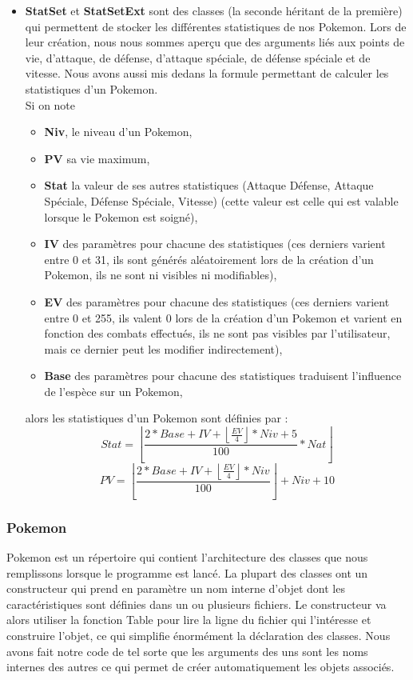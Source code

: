 \documentclass[a4paper,twoside, openany,11pt]{book}
\newcommand{\Floor}[1]{\left\lfloor #1 \right\rfloor}
\begin{document}
\begin{itemize}
\item  \textbf{StatSet} et \textbf{StatSetExt} sont des classes (la seconde héritant de la première) qui permettent de stocker les différentes statistiques de nos Pokemon. Lors de leur création, nous nous sommes aperçu que des arguments liés aux points de vie, d'attaque, de défense, d'attaque spéciale, de défense spéciale et de vitesse. Nous avons aussi mis dedans la formule permettant de calculer les statistiques d'un Pokemon. \\
Si on note
\begin{itemize}
\item \textbf{Niv}, le niveau d'un Pokemon, \\
\item \textbf{PV} sa vie maximum, \\
\item \textbf{Stat} la valeur de ses autres statistiques (Attaque Défense, Attaque Spéciale, Défense Spéciale, Vitesse) (cette valeur est celle qui est valable lorsque le Pokemon est soigné), \\
\item \textbf{IV} des paramètres pour chacune des statistiques (ces derniers varient entre 0 et 31, ils sont générés aléatoirement lors de la création d'un Pokemon, ils ne sont ni visibles ni modifiables),\\
\item \textbf{EV} des paramètres pour chacune des statistiques (ces derniers varient entre 0 et 255, ils valent 0 lors de la création d'un Pokemon et varient en fonction des combats effectués, ils ne sont pas visibles par l'utilisateur, mais ce dernier peut les modifier indirectement),\\
\item \textbf{Base} des paramètres pour chacune des statistiques traduisent l'influence de l'espèce sur un Pokemon,
\end{itemize}
alors les statistiques d'un Pokemon sont définies par :
\[
Stat = \Floor{\dfrac{2 * Base + IV + \Floor{\frac{EV}{4}} * Niv + 5}{100} * Nat}
\]
\[
PV =\Floor{\dfrac{2 * Base + IV + \Floor{\frac{EV}{4}} * Niv}{100}} + Niv + 10
\]
\end{itemize}

\subsubsection{Pokemon}
Pokemon est un répertoire qui contient l'architecture des classes que nous remplissons lorsque le programme est lancé. La plupart des classes ont un constructeur qui prend en paramètre un nom interne d'objet dont les caractéristiques sont définies dans un ou plusieurs fichiers. Le constructeur va alors utiliser la fonction Table pour lire la ligne du fichier qui l’intéresse et construire l'objet, ce qui simplifie énormément la déclaration des classes. Nous avons fait notre code de tel sorte que les arguments des uns sont les noms internes des autres ce qui permet de créer automatiquement les objets associés. 
\end{document}
